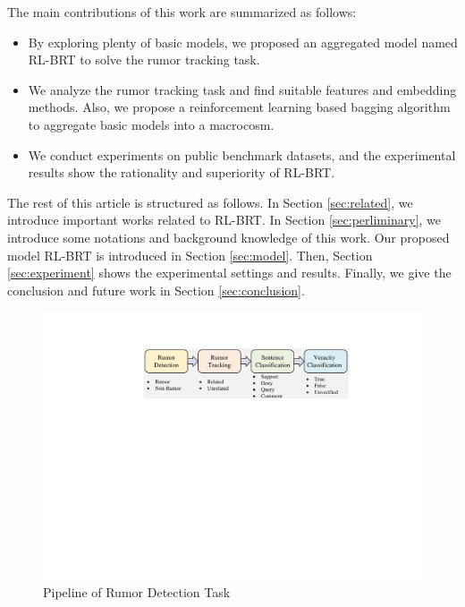 The main contributions of this work are summarized as follows:
\begin{itemize}
	\item By exploring plenty of basic models, we proposed an aggregated model named RL-BRT to solve the rumor tracking task. 
	\item We analyze the rumor tracking task and find suitable features and embedding methods. Also, we propose a reinforcement learning based bagging algorithm to aggregate basic models into a macrocosm.
	\item We conduct experiments on public benchmark datasets, and the experimental results show the rationality and superiority of RL-BRT.
\end{itemize}

The rest of this article is structured as follows. In Section \ref{sec:related}, we introduce important works related to RL-BRT. In Section \ref{sec:perliminary}, we introduce some notations and background knowledge of this work. Our proposed model RL-BRT is introduced in Section \ref{sec:model}. Then, Section \ref{sec:experiment} shows the experimental settings and results. Finally, we give the conclusion and future work in Section \ref{sec:conclusion}.

\begin{figure}[tbp]
	\hspace{0ex}
	\vspace{0ex}
	\centering
	\includegraphics[width = \textwidth]{fig/pipeline}
	\caption{Pipeline of Rumor Detection Task}
	\label{fig:pipeline}
\end{figure}